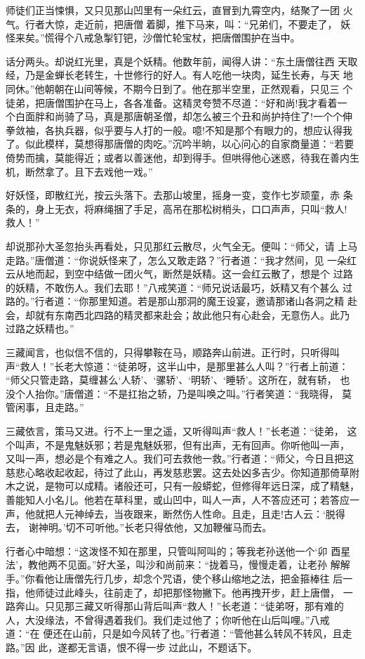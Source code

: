 师徒们正当悚惧，又只见那山凹里有一朵红云，直冒到九霄空内，结聚了一团
火气。行者大惊，走近前，把唐僧着脚，推下马来，叫：“兄弟们，不要走了，
妖怪来矣。”慌得个八戒急掣钉钯，沙僧忙轮宝杖，把唐僧围护在当中。

话分两头。却说红光里，真是个妖精。他数年前，闻得人讲：“东土唐僧往西
天取经，乃是金蝉长老转生，十世修行的好人。有人吃他一块肉，延生长寿，与天
地同休。”他朝朝在山间等候，不期今日到了。他在那半空里，正然观看，只见三
个徒弟，把唐僧围护在马上，各各准备。这精灵夸赞不尽道：“好和尚!我才看着一
个白面胖和尚骑了马，真是那唐朝圣僧，却怎么被三个丑和尚护持住了!一个个伸
拳敛袖，各执兵器，似乎要与人打的一般。噫!不知是那个有眼力的，想应认得我
了。似此模样，莫想得那唐僧的肉吃。”沉吟半晌，以心问心的自家商量道：“若要
倚势而擒，莫能得近；或者以善迷他，却到得手。但哄得他心迷惑，待我在善内生
机，断然拿了。且下去戏他一戏。”

好妖怪，即散红光，按云头落下。去那山坡里，摇身一变，变作七岁顽童，赤
条条的，身上无衣，将麻绳捆了手足，高吊在那松树梢头，口口声声，只叫“救人!
救人！”

却说那孙大圣忽抬头再看处，只见那红云散尽，火气全无。便叫：“师父，请
上马走路。”唐僧道：“你说妖怪来了，怎么又敢走路？”行者道：“我才然间，见
一朵红云从地而起，到空中结做一团火气，断然是妖精。这一会红云散了，想是个
过路的妖精，不敢伤人。我们去耶！”八戒笑道：“师兄说话最巧，妖精又有个甚么
过路的。”行者道：“你那里知道。若是那山那洞的魔王设宴，邀请那诸山各洞之精
赴会，却就有东南西北四路的精灵都来赴会；故此他只有心赴会，无意伤人。此乃
过路之妖精也。”

三藏闻言，也似信不信的，只得攀鞍在马，顺路奔山前进。正行时，只听得叫
声“救人！”长老大惊道：“徒弟呀，这半山中，是那里甚么人叫？”行者上前道：
“师父只管走路，莫缠甚么‘人轿’、‘骡轿’、‘明轿’、‘睡轿’。这所在，就有轿，
也没个人抬你。”唐僧道：“不是扛抬之轿，乃是叫唤之叫。”行者笑道：“我晓得，
莫管闲事，且走路。”

三藏依言，策马又进。行不上一里之遥，又听得叫声“救人！”长老道：“徒弟，
这个叫声，不是鬼魅妖邪；若是鬼魅妖邪，但有出声，无有回声。你听他叫一声，
又叫一声，想必是个有难之人。我们可去救他一救。”行者道：“师父，今日且把这
慈悲心略收起收起，待过了此山，再发慈悲罢。这去处凶多吉少。你知道那倚草附
木之说，是物可以成精。诸般还可，只有一般蟒蛇，但修得年远日深，成了精魅，
善能知人小名儿。他若在草科里，或山凹中，叫人一声，人不答应还可；若答应一
声，他就把人元神绰去，当夜跟来，断然伤人性命。且走，且走!古人云：‘脱得去，
谢神明。’切不可听他。”长老只得依他，又加鞭催马而去。

行者心中暗想：“这泼怪不知在那里，只管叫阿叫的；等我老孙送他一个‘卯
酉星法’，教他两不见面。”好大圣，叫沙和尚前来：“拢着马，慢慢走着，让老孙
解解手。”你看他让唐僧先行几步，却念个咒语，使个移山缩地之法，把金箍棒往
后一指，他师徒过此峰头，往前走了，却把那怪物撇下。他再拽开步，赶上唐僧，
一路奔山。只见那三藏又听得那山背后叫声“救人！”长老道：“徒弟呀，那有难的
人，大没缘法，不曾得遇着我们。我们走过他了；你听他在山后叫哩。”八戒道：“在
便还在山前，只是如今风转了也。”行者道：“管他甚么转风不转风，且走路。”因
此，遂都无言语，恨不得一步过此山，不题话下。

